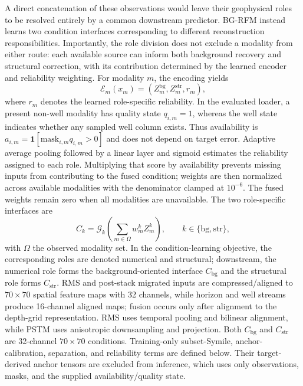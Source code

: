 A direct concatenation of these observations would leave their geophysical roles to be resolved entirely by a common downstream predictor. BG-RFM instead learns two condition interfaces corresponding to different reconstruction responsibilities. Importantly, the role division does not exclude a modality from either route: each available source can inform both background recovery and structural correction, with its contribution determined by the learned encoder and reliability weighting. For modality $m$, the encoding yields
\begin{equation}
\mathcal E_m(x_m)=\left(Z_m^{\mathrm{bg}},Z_m^{\mathrm{str}},r_m\right),
\end{equation}
where $r_m$ denotes the learned role-specific reliability. In the evaluated loader, a present non-well modality has quality state $q_{i,m}=1$, whereas the well state indicates whether any sampled well column exists. Thus availability is $a_{i,m}=\mathbf{1}[\mathrm{mask}_{i,m}q_{i,m}>0]$ and does not depend on target error. Adaptive average pooling followed by a linear layer and sigmoid estimates the reliability assigned to each role. Multiplying that score by availability prevents missing inputs from contributing to the fused condition; weights are then normalized across available modalities with the denominator clamped at $10^{-6}$. The fused weights remain zero when all modalities are unavailable. The two role-specific interfaces are
\begin{equation}
C_k=\mathcal G_k\left(\sum_{m\in\Omega}w_m^k Z_m^k\right),
\qquad k\in\{\mathrm{bg},\mathrm{str}\},
\end{equation}
with $\Omega$ the observed modality set. In the condition-learning objective, the corresponding roles are denoted numerical and structural; downstream, the numerical role forms the background-oriented interface $C_{\mathrm{bg}}$ and the structural role forms $C_{\mathrm{str}}$. RMS and post-stack migrated inputs are compressed/aligned to $70\times70$ spatial feature maps with 32 channels, while horizon and well streams produce 16-channel aligned maps; fusion occurs only after alignment to the depth-grid representation. RMS uses temporal pooling and bilinear alignment, while PSTM uses anisotropic downsampling and projection. Both $C_{\mathrm{bg}}$ and $C_{\mathrm{str}}$ are 32-channel $70\times70$ conditions. Training-only subset-Symile, anchor-calibration, separation, and reliability terms are defined below. Their target-derived anchor tensors are excluded from inference, which uses only observations, masks, and the supplied availability/quality state.


